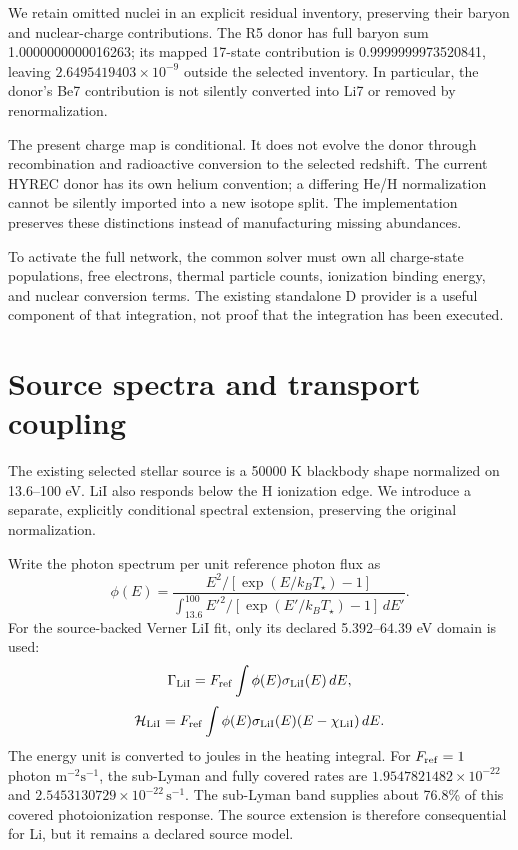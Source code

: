 \documentclass[
  10pt,
]{article}
\begin{document}
We retain omitted nuclei in an explicit residual inventory, preserving
their baryon and nuclear-charge contributions. The R5 donor has full
baryon sum 1.0000000000016263; its mapped 17-state contribution is
0.9999999973520841, leaving \(2.6495419403\times10^{-9}\) outside the
selected inventory. In particular, the donor's Be7 contribution is not
silently converted into Li7 or removed by renormalization.

The present charge map is conditional. It does not evolve the donor
through recombination and radioactive conversion to the selected
redshift. The current HYREC donor has its own helium convention; a
differing He/H normalization cannot be silently imported into a new
isotope split. The implementation preserves these distinctions instead
of manufacturing missing abundances.

To activate the full network, the common solver must own all
charge-state populations, free electrons, thermal particle counts,
ionization binding energy, and nuclear conversion terms. The existing
standalone D provider is a useful component of that integration, not
proof that the integration has been executed.

\hypertarget{source-spectra-and-transport-coupling}{%
\section{Source spectra and transport
coupling}\label{source-spectra-and-transport-coupling}}

The existing selected stellar source is a 50000 K blackbody shape
normalized on 13.6--100 eV. LiI also responds below the H ionization
edge. We introduce a separate, explicitly conditional spectral
extension, preserving the original normalization.

Write the photon spectrum per unit reference photon flux as \[
\phi(E)=\frac{E^2/[\exp(E/k_BT_\star)-1]}
{\int_{13.6}^{100}E'^2/[\exp(E'/k_BT_\star)-1]\,dE'}.
\] For the source-backed Verner LiI fit, only its declared 5.392--64.39
eV domain is used: \[
\Gamma_{\rm LiI}=F_{\rm ref}\int\phi(E)\sigma_{\rm LiI}(E)\,dE,
\] \[
\mathcal H_{\rm LiI}=F_{\rm ref}\int
\phi(E)\sigma_{\rm LiI}(E)(E-\chi_{\rm LiI})\,dE.
\] The energy unit is converted to joules in the heating integral. For
\(F_{\rm ref}=1\) photon \(\mathrm{m}^{-2}\mathrm{s}^{-1}\), the
sub-Lyman and fully covered rates are \(1.9547821482\times10^{-22}\) and
\(2.5453130729\times10^{-22}\,\mathrm{s}^{-1}\). The sub-Lyman band
supplies about 76.8\% of this covered photoionization response. The
source extension is therefore consequential for Li, but it remains a
declared source model.
\end{document}

